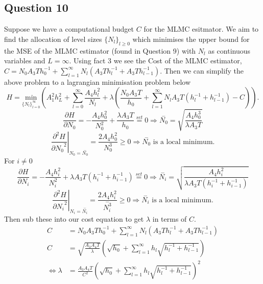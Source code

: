 \documentclass{article}
\begin{document}
\subsection{Question 10}
Suppose we have a computational budget $C$ for the MLMC esitmator. We aim to find the allocation of level sizes $\{ \overset{~}{N}_l \}_{l\geq0}$ which minimises the upper bound for the MSE of the MLMC estimator (found in Question 9) with $N_l$ as continuous variables and $L=\infty$. Using fact 3 we see the Cost of the MLMC estimator, $C = N_0 A_3 T h^{-1}_0 + \sum_{l=1}^\infty N_l(A_3 T h^{-1}_l + A_3 T h^{-1}_{l-1})$. Then we can simplify the above problem to a lagrangian minimisation problem below
\begin{equation*}
H=\underset{\{N_l\}_{l=0}^\infty}{\text{min}}  \left( A_1^2h_L^2 + \sum_{l=0}^\infty \frac{A_4 h_l^2}{N_l} + \lambda \left( \frac{N_0 A_3 T}{ h_0} + \sum_{l=1}^\infty N_l A_3 T (h^{-1}_l + h^{-1}_{l-1}) - C \right) \right).
\end{equation*}
\begin{equation*}
\frac{\partial H}{\partial N_0} = - \frac{A_4h_0^2}{N_0^2}+ \frac{\lambda A_3 T}{h_0} \overset{set}{=} 0 \Rightarrow \overset{-}{N_0} = \sqrt{\frac{A_4h_0^3}{\lambda A_3 T}}
\end{equation*}
\begin{equation*}
\left. \frac{\partial^2 H}{{\partial N_0}^2} \right|_{N_0=\overset{-}{N_0}} = \frac{2A_4h_0^2}{N_0^3} \geq 0 \Rightarrow \overset{-}{N_0} \text{ is a local minimum.}
\end{equation*}
For $i \ne 0$
\begin{equation*}
\frac{\partial H}{\partial N_i} = - \frac{A_4h_i^2}{N_i^2}+ \lambda A_3 T (h_i^{-1}+h_{i-1}^{-1}) \overset{set}{=} 0 \Rightarrow \overset{-}{N_i} = \sqrt{\frac{A_4 h_i^2}{\lambda A_3 T (h_i^{-1}+h_{i-1}^{-1})}}
\end{equation*}
\begin{equation*}
\left. \frac{\partial^2 H}{{\partial N_i}^2} \right|_{N_i=\overset{-}{N_i}} = \frac{2A_4 h_i^2}{\overset{-}{N_i^3}} \geq 0 \Rightarrow \overset{-}{N_i} \text{ is a local minimum.}
\end{equation*}
Then sub these into our cost equation to get $\lambda$ in terms of $C$.
\begin{equation*}
\begin{split}
C &= N_0 A_3 T h^{-1}_0 + \sum_{l=1}^\infty N_l(A_3 T h^{-1}_l + A_3 T h^{-1}_{l-1})\\
C &= \sqrt{\frac{A_3A_4T}{\lambda}} \left( \sqrt{h_0} + \sum_{l=1}^\infty h_l \sqrt{h^{-1}_l + h^{-1}_{l-1}} \right)\\
\iff \lambda &= \frac{A_3A_4 T}{C^2} \left( \sqrt{h_0} + \sum_{l=1}^\infty h_l \sqrt{h^{-1}_l + h^{-1}_{l-1}} \right)^2
\end{split}
\end{equation*}
\end{document}
